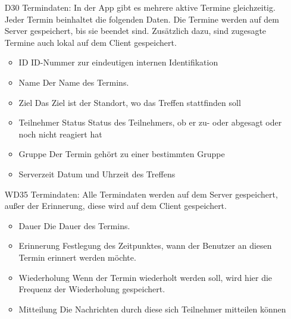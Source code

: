 \documentclass{scrartcl}
\begin{document}
\begin{itemize}
		\item [D30] Termindaten:
		\newline In der App gibt es mehrere aktive Termine gleichzeitig. Jeder Termin beinhaltet die folgenden Daten.
		Die Termine werden auf dem Server gespeichert, bis sie beendet sind. Zusätzlich dazu, sind zugesagte Termine auch lokal auf dem Client gespeichert.
		\begin{itemize}
			\item ID
			\newline ID-Nummer zur eindeutigen internen Identifikation
			\item Name
			\newline Der Name des Termins.
			\item Ziel
			\newline Das Ziel ist der Standort, wo das Treffen stattfinden soll
			\item \gls{Teilnehmer} Status
			\newline Status des Teilnehmers, ob er zu- oder abgesagt oder noch nicht reagiert hat
			\item Gruppe
			\newline Der Termin gehört zu einer bestimmten Gruppe
			\item Serverzeit
			\newline Datum und Uhrzeit des Treffens
		\end{itemize}
		
		\item [WD35] Termindaten:%
Alle Termindaten werden auf dem Server gespeichert, außer der Erinnerung, diese wird auf dem Client gespeichert.
	 	\begin{itemize}
			\item Dauer
			\newline Die Dauer des Termins.
			\item Erinnerung
			\newline Festlegung des Zeitpunktes, wann der Benutzer an diesen Termin erinnert werden möchte.
			\item Wiederholung
			\newline Wenn der Termin wiederholt werden soll, wird hier die Frequenz der Wiederholung gespeichert.
			\item Mitteilung
			\newline Die Nachrichten durch diese sich Teilnehmer mitteilen können
		\end{itemize}
	\end{itemize}
	
	\newpage
	
\end{document}

